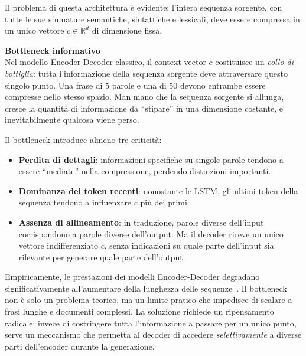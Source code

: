 Il problema di questa architettura è evidente: l'intera sequenza sorgente, con tutte le sue sfumature semantiche, sintattiche e lessicali, deve essere compressa in un unico vettore $c \in \mathbb{R}^d$ di dimensione fissa.
\begin{notebox}
\textbf{Bottleneck informativo}\\
Nel modello Encoder-Decoder classico, il context vector $c$ costituisce un \textit{collo di bottiglia}: tutta l'informazione della sequenza sorgente deve attraversare questo singolo punto. Una frase di 5 parole e una di 50 devono entrambe essere compresse nello stesso spazio. Man mano che la sequenza sorgente si allunga, cresce la quantità di informazione da ``stipare'' in una dimensione costante, e inevitabilmente qualcosa viene perso.
\end{notebox}
Il bottleneck introduce almeno tre criticità:
\begin{itemize}
    \item \textbf{Perdita di dettagli}: informazioni specifiche su singole parole tendono a essere ``mediate'' nella compressione, perdendo distinzioni importanti.
    \item \textbf{Dominanza dei token recenti}: nonostante le LSTM, gli ultimi token della sequenza tendono a influenzare $c$ più dei primi.
    \item \textbf{Assenza di allineamento}: in traduzione, parole diverse dell'input corrispondono a parole diverse dell'output. Ma il decoder riceve un unico vettore indifferenziato $c$, senza indicazioni su quale parte dell'input sia rilevante per generare quale parte dell'output.
\end{itemize}
Empiricamente, le prestazioni dei modelli Encoder-Decoder degradano significativamente all'aumentare della lunghezza delle sequenze~\parencite{bahdanau2014neural}. Il bottleneck non è solo un problema teorico, ma un limite pratico che impedisce di scalare a frasi lunghe e documenti complessi.
La soluzione richiede un ripensamento radicale: invece di costringere tutta l'informazione a passare per un unico punto, serve un meccanismo che permetta al decoder di accedere \textit{selettivamente} a diverse parti dell'encoder durante la generazione.




